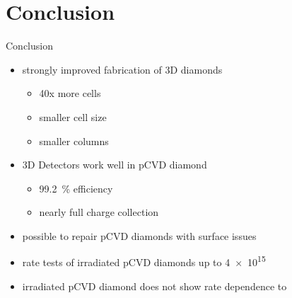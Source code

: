 \section{Conclusion}
\begin{frame}{Conclusion}

	\begin{minipage}[c][5cm]{\textwidth}
		\begin{itemize}\itemfill
			\item strongly improved fabrication of 3D diamonds
			\begin{itemize}
				\item 40x more cells
				\item smaller cell size
				\item smaller columns\vspace*{5pt}
			\end{itemize}
			\item 3D Detectors work well in pCVD diamond
			\begin{itemize}
				\item \SI{99.2}{\%} efficiency
				\item nearly full charge collection\vspace*{5pt}
			\end{itemize}
			\item possible to repair pCVD diamonds with surface issues
			\item rate tests of irradiated pCVD diamonds up to \SI{4e15}{\ncm}
			\item irradiated pCVD diamond does not show rate dependence to  
		\end{itemize}
	\end{minipage}
	
\end{frame}

